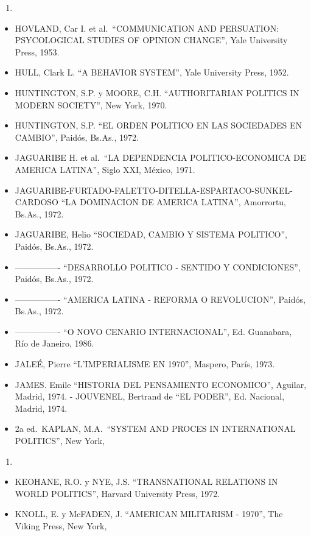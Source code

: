 \documentclass[
]{book}
\providecommand{\tightlist}{%
  \setlength{\itemsep}{0pt}\setlength{\parskip}{0pt}}
\begin{document}
\begin{enumerate}
\def\labelenumi{\arabic{enumi}.}
\setcounter{enumi}{1968}
\tightlist
\item
\end{enumerate}

\begin{itemize}
\tightlist
\item
  HOVLAND, Car I. et al.~``COMMUNICATION AND PERSUATION: PSYCOLOGICAL STUDIES
  OF OPINION CHANGE'', Yale University Press, 1953.
\item
  HULL, Clark L. ``A BEHAVIOR SYSTEM'', Yale University Press, 1952.
\item
  HUNTINGTON, S.P. y MOORE, C.H. ``AUTHORITARIAN POLITICS IN MODERN SOCIETY'',
  New York, 1970.
\item
  HUNTINGTON, S.P. ``EL ORDEN POLITICO EN LAS SOCIEDADES EN CAMBIO'', Paidós,
  Bs.As., 1972.
\item
  JAGUARIBE H. et al.~``LA DEPENDENCIA POLITICO-ECONOMICA DE AMERICA LATINA'',
  Siglo XXI, México, 1971.
\item
  JAGUARIBE-FURTADO-FALETTO-DITELLA-ESPARTACO-SUNKEL- CARDOSO ``LA
  DOMINACION DE AMERICA LATINA'', Amorrortu, Bs.As., 1972.
\item
  JAGUARIBE, Helio ``SOCIEDAD, CAMBIO Y SISTEMA POLITICO'', Paidós, Bs.As., 1972.
\item
  ---------------- ``DESARROLLO POLITICO - SENTIDO Y CONDICIONES'', Paidós, Bs.As., 1972.
\item
  ---------------- ``AMERICA LATINA - REFORMA O REVOLUCION'', Paidós, Bs.As., 1972.
\item
  ---------------- ``O NOVO CENARIO INTERNACIONAL'', Ed. Guanabara, Río de Janeiro, 1986.
\item
  JALEÉ, Pierre ``L'IMPERIALISME EN 1970'', Maspero, París, 1973.
\item
  JAMES. Emile ``HISTORIA DEL PENSAMIENTO ECONOMICO'', Aguilar, Madrid, 1974. - JOUVENEL, Bertrand de ``EL PODER'', Ed. Nacional, Madrid, 1974.
\item
  2a ed.~KAPLAN, M.A.~``SYSTEM AND PROCES IN INTERNATIONAL POLITICS'', New York,
\end{itemize}

\begin{enumerate}
\def\labelenumi{\arabic{enumi}.}
\setcounter{enumi}{1956}
\tightlist
\item
\end{enumerate}

\begin{itemize}
\tightlist
\item
  KEOHANE, R.O. y NYE, J.S. ``TRANSNATIONAL RELATIONS IN WORLD POLITICS'',
  Harvard University Press, 1972.
\item
  KNOLL, E. y McFADEN, J. ``AMERICAN MILITARISM - 1970'', The Viking Press, New York,
\end{itemize}
\end{document}
